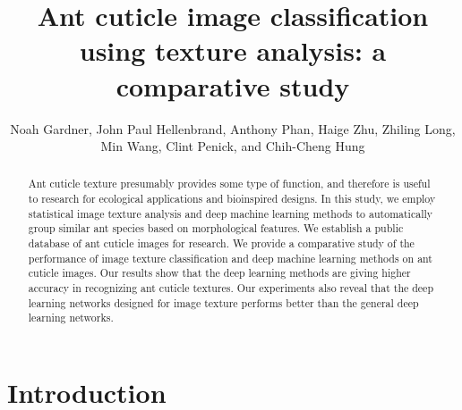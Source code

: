 \documentclass{aci}
\numberwithin{equation}{section}
\begin{document}
\title{Ant cuticle image classification using texture analysis: a comparative
    study}

\author{%
    Noah Gardner,
    John Paul Hellenbrand,
    Anthony Phan,
    Haige Zhu,
    Zhiling Long,
    Min Wang,
    Clint Penick,
    and Chih-Cheng Hung\corrauth
}%


\address{%
}


\begin{abstract}
    Ant cuticle texture presumably provides some type of function, and therefore
    is useful to research for ecological applications and bioinspired designs.
    In this study, we employ statistical image texture analysis and deep machine
    learning methods to automatically group similar ant species based on
    morphological features. We establish a public database of ant cuticle images
    for research. We provide a comparative study of the performance of image
    texture classification and deep machine learning methods on ant cuticle
    images. Our results show that the deep learning methods are giving higher
    accuracy in recognizing ant cuticle textures. Our experiments also reveal
    that the deep learning networks designed for image texture performs better
    than the general deep learning networks.
\end{abstract}
\maketitle

\section{Introduction}
\end{document}
